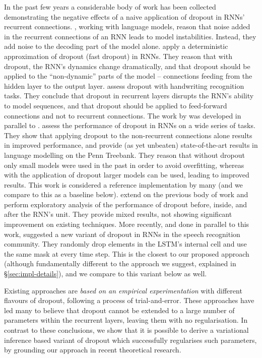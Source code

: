 \documentclass{article}
\theoremstyle{definition}
\begin{document}
In the past few years a considerable body of work has been collected demonstrating the negative effects of a naive application of dropout in RNNs' recurrent connections.
\citet{pachitariu2013regularization}, working with language models, reason that noise added in the recurrent connections of an RNN leads to model instabilities. Instead, they add noise to the decoding part of the model alone.
\citet{bayer2013fast} apply a deterministic approximation of dropout (fast dropout) in RNNs. They reason that with dropout, the RNN's dynamics change dramatically, and that dropout should be applied to the ``non-dynamic'' parts of the model -- connections feeding from the hidden layer to the output layer.
\citet{pham2014dropout} assess dropout with handwriting recognition tasks. They conclude that dropout in recurrent layers disrupts the RNN's ability to model sequences, and that dropout should be applied to feed-forward connections and not to recurrent connections. 
The work by \citet*{zaremba2014recurrent} was developed in parallel to \citet{pham2014dropout}. \citet{zaremba2014recurrent} assess the performance of dropout in RNNs on a wide series of tasks. They show that applying dropout to the non-recurrent connections alone results in improved performance, and provide (as yet  unbeaten) state-of-the-art results in language modelling on the Penn Treebank. 
They reason that without dropout only small models were used in the past in order to avoid overfitting, whereas with the application of dropout larger models can be used, leading to improved results.
This work is considered a reference implementation by many (and we compare to this as a baseline below).
\citet{bluche2015apply} extend on the previous body of work and perform exploratory analysis of the performance of dropout before, inside, and after the RNN's unit. They provide mixed results, not showing significant improvement on existing techniques.
More recently, and done in parallel to this work, \citet{moon2015rnndrop} suggested a new variant of dropout in RNNs in the speech recognition community. They randomly drop elements in the LSTM's internal cell  and use the same mask at every time step. This is the closest to our proposed approach (although fundamentally different to the approach we suggest, explained in \S\ref{sec:impl-details}), and we compare to this variant below as well.

Existing approaches are \textit{based on an empirical experimentation} with different flavours of dropout, following a process of trial-and-error. These approaches have led many to believe that dropout cannot be extended to a large number of parameters within the recurrent layers, leaving them with no regularisation. 
In contrast to these conclusions, we show that it is possible to derive a variational inference based variant of dropout which successfully regularises such parameters, by grounding our approach in recent theoretical research.
\end{document}
